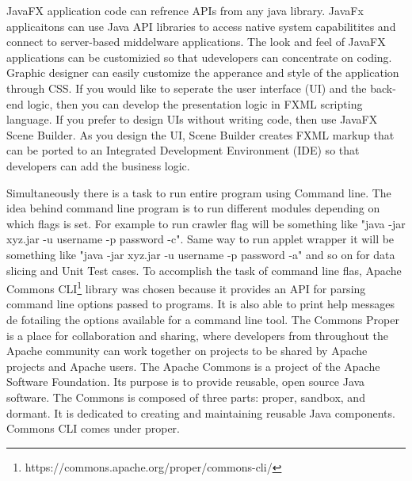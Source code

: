 \documentclass[article,type=msc,colorback,accentcolor=tud9c,twoside,11pt]{tudthesis}
\begin{document}
JavaFX application code can refrence APIs from any java library. JavaFx applicaitons can use Java API libraries to access native system capabilitites and connect to server-based middelware applications. The look and feel of JavaFX applications can be customizied so that udevelopers can concentrate on coding. Graphic designer can easily customize the apperance and style of the application through CSS. If you would like to seperate the user interface (UI) and the back-end logic, then you can develop the presentation logic in FXML scripting language. If you prefer to design UIs without writing code, then use JavaFX Scene Builder. As you design the UI, Scene Builder creates FXML markup that can be ported to an Integrated Development Environment (IDE) so that developers can add the business logic.

Simultaneously there is a task to run entire program using Command line. The idea behind command line program is to run different modules depending on which flags is set. For example to run crawler flag will be something like "java -jar xyz.jar -u username -p password -c". Same way to run applet wrapper it will be something like  "java -jar xyz.jar -u username -p password -a" and so on for data slicing and Unit Test cases. To accomplish the task of command line flas, Apache Commons CLI\footnote{https://commons.apache.org/proper/commons-cli/} library was chosen because it provides an API for parsing command line options passed to programs. It is also able to print help messages de fotailing the options available for a command line tool. The Commons Proper is a place for collaboration and sharing, where developers from throughout the Apache community can work together on projects to be shared by Apache projects and Apache users. The Apache Commons is a project of the Apache Software Foundation. Its purpose is to provide reusable, open source Java software. The Commons is composed of three parts: proper, sandbox, and dormant. It is dedicated to creating and maintaining reusable Java components. Commons CLI comes under proper.
\end{document}
